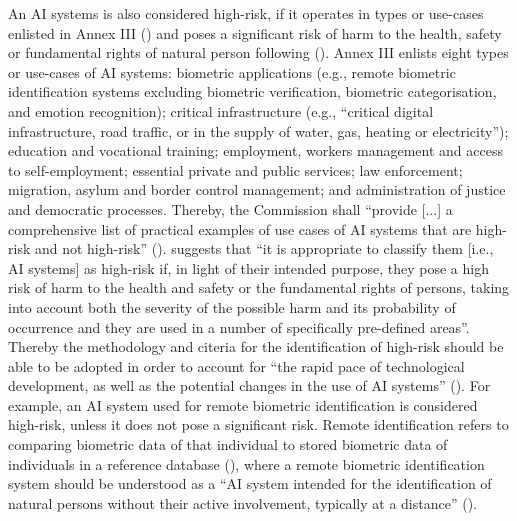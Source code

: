 An AI systems is also considered high-risk, if it operates in types or use-cases enlisted in
Annex III () and poses a significant risk of harm to the health,
safety or fundamental rights of natural person following ().
%
Annex III enlists eight types or use-cases of AI systems: biometric applications (e.g., remote biometric identification systems excluding biometric verification, biometric categorisation, and emotion recognition); critical infrastructure (e.g., ``critical digital infrastructure, road traffic, or in the supply of
water, gas, heating or electricity''); education and vocational training; employment, workers management and access to self-employment; essential private and public services; law enforcement; migration, asylum and border control management; and administration of justice and democratic processes. 
%
%
Thereby, the Commission shall ``provide [...] a comprehensive list of practical examples of use cases
of AI systems that are high-risk and not high-risk'' ().
%
  suggests that ``it is appropriate to classify
them [i.e., AI systems] as high-risk if, in light of their intended purpose, they pose a high risk of harm to the
health and safety or the fundamental rights of persons, taking into account both the severity
of the possible harm and its probability of occurrence and they are used in a number of
specifically pre-defined areas''. 
%
Thereby the methodology and citeria for the identification of high-risk should be able to be adopted in order to 
% 
account for ``the rapid pace of technological
development, as well as the potential changes in the use of AI systems'' ().
%
For example, an AI system used for remote biometric identification is considered high-risk, unless it does not pose a significant risk. Remote identification refers to comparing biometric data of that individual to stored biometric data of
individuals in a reference database (), where a remote biometric identification system should be understood as a ``AI system intended for the identification of natural persons
without their active involvement, typically at a distance'' ().



